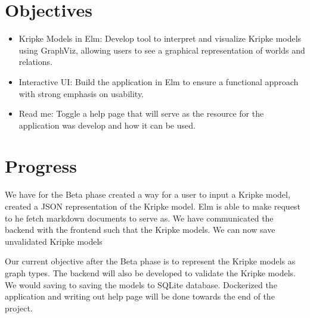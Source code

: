 

\section{Objectives}
\begin{itemize}
\item Kripke Models in Elm: Develop tool to interpret and visualize Kripke models using GraphViz, allowing users to see a graphical representation of worlds and relations.
\item Interactive UI: Build the application in Elm to ensure a functional approach with strong emphasis on usability. 
\item Read me: Toggle a help page that will serve as the resource for the application was develop and how it can be used.
\end{itemize}


\section{Progress}
We have for the Beta phase created a way for a user to input a Kripke model, created a JSON representation of the Kripke model. Elm is able to make request to he fetch markdown documents to serve as. We have communicated the backend with the frontend such that the Kripke models. We can now save unvalidated Kripke models

Our current objective after the Beta phase is to represent the Kripke models as graph types. The backend will also be developed to validate the Kripke models. We would saving to saving the models to SQLite database. Dockerized the application and writing out help page will be done towards the end of the project.

